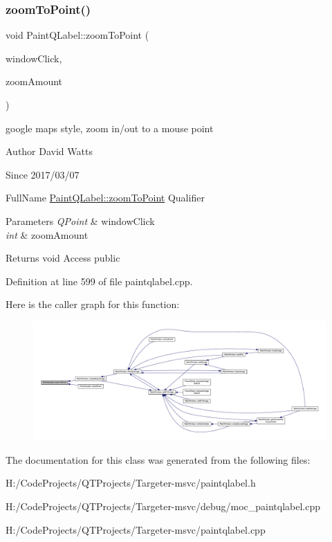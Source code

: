 \subsubsection{\texorpdfstring{zoom\+To\+Point()}{zoomToPoint()}}
{\footnotesize\ttfamily void Paint\+Q\+Label\+::zoom\+To\+Point (\begin{DoxyParamCaption}\item[{Q\+Point}]{window\+Click,  }\item[{int}]{zoom\+Amount }\end{DoxyParamCaption})}

google maps style, zoom in/out to a mouse point

\begin{DoxyAuthor}{Author}
David Watts 
\end{DoxyAuthor}
\begin{DoxySince}{Since}
2017/03/07
\end{DoxySince}
Full\+Name \hyperlink{class_paint_q_label_a30afcb97e84548909b882e0514111e03}{Paint\+Q\+Label\+::zoom\+To\+Point} Qualifier 
\begin{DoxyParams}{Parameters}
{\em Q\+Point} & window\+Click \\
\hline
{\em int} & zoom\+Amount \\
\hline
\end{DoxyParams}
\begin{DoxyReturn}{Returns}
void Access public 
\end{DoxyReturn}


Definition at line 599 of file paintqlabel.\+cpp.

Here is the caller graph for this function\+:
\nopagebreak
\begin{figure}[H]
\begin{center}
\leavevmode
\includegraphics[width=350pt]{class_paint_q_label_a30afcb97e84548909b882e0514111e03_icgraph}
\end{center}
\end{figure}


The documentation for this class was generated from the following files\+:\begin{DoxyCompactItemize}
\item 
H\+:/\+Code\+Projects/\+Q\+T\+Projects/\+Targeter-\/msvc/paintqlabel.\+h\item 
H\+:/\+Code\+Projects/\+Q\+T\+Projects/\+Targeter-\/msvc/debug/moc\+\_\+paintqlabel.\+cpp\item 
H\+:/\+Code\+Projects/\+Q\+T\+Projects/\+Targeter-\/msvc/paintqlabel.\+cpp\end{DoxyCompactItemize}
